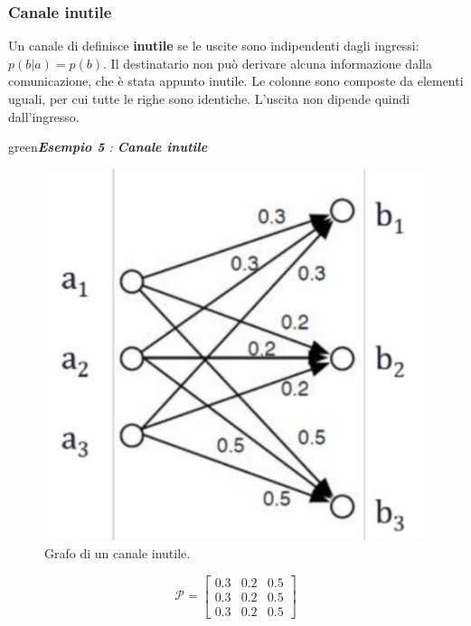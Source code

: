 \subsubsection{Canale inutile}
Un canale di definisce \textbf{inutile} se le uscite sono indipendenti dagli ingressi: $p(b|a) = p(b)$. Il destinatario non può derivare alcuna informazione dalla comunicazione, che è stata appunto inutile. Le colonne sono composte da elementi uguali, per cui tutte le righe sono identiche. L'uscita non dipende quindi dall'ingresso.
\begin{mybox}{green}{\textit{\textbf{Esempio 5} : \textbf{Canale inutile}}}
\begin{minipage}{0.45\textwidth}
\begin{figure}[H]
    \centering
    \includegraphics[scale=0.2]{img/inutile.png}
    \caption{Grafo di un canale inutile.}
\end{figure}
\end{minipage}
\begin{minipage}{0.45\textwidth}
\begin{equation*}
    \mathcal{P} = \begin{bmatrix}
    0.3 & 0.2 & 0.5 \\
    0.3 & 0.2 & 0.5 \\
    0.3 & 0.2 & 0.5    
    \end{bmatrix}
\end{equation*}
\end{minipage}
\end{mybox}
